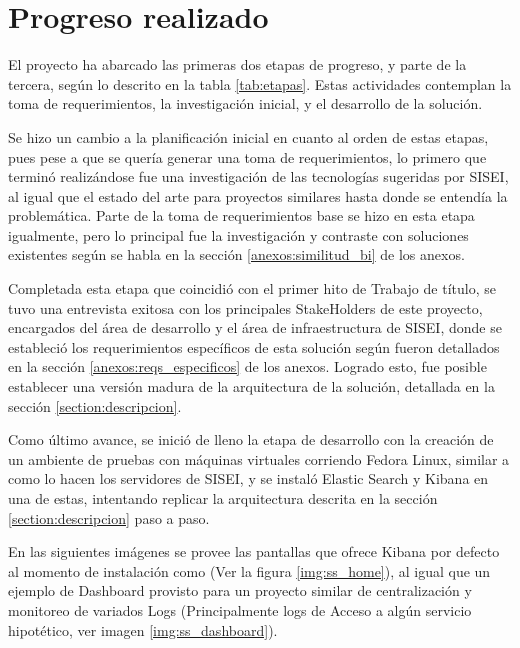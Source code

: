 \section{Progreso realizado}

El proyecto ha abarcado las primeras dos etapas de progreso, y parte de la tercera, según lo descrito en la tabla \ref{tab:etapas}. Estas actividades contemplan la toma de requerimientos, la investigación inicial, y el desarrollo de la solución.

Se hizo un cambio a la planificación inicial en cuanto al orden de estas etapas, pues pese a que se quería generar una toma de requerimientos, lo primero que terminó realizándose fue una investigación de las tecnologías sugeridas por SISEI, al igual que el estado del arte para proyectos similares hasta donde se entendía la problemática. Parte de la toma de requerimientos base se hizo en esta etapa igualmente, pero lo principal fue la investigación y contraste con soluciones existentes según se habla en la sección \ref{anexos:similitud_bi} de los anexos.

Completada esta etapa que coincidió con el primer hito de Trabajo de título, se tuvo una entrevista exitosa con los principales StakeHolders de este proyecto, encargados del área de desarrollo y el área de infraestructura de SISEI, donde se estableció los requerimientos específicos de esta solución según fueron detallados en la sección \ref{anexos:reqs_especificos} de los anexos. Logrado esto, fue posible establecer una versión madura de la arquitectura de la solución, detallada en la sección \ref{section:descripcion}.

Como último avance, se inició de lleno la etapa de desarrollo con la creación de un ambiente de pruebas con máquinas virtuales corriendo Fedora Linux, similar a como lo hacen los servidores de SISEI, y se instaló Elastic Search y Kibana en una de estas, intentando replicar la arquitectura descrita en la sección \ref{section:descripcion} paso a paso.

En las siguientes imágenes se provee las pantallas que ofrece Kibana por defecto al momento de instalación como  (Ver la figura \ref{img:ss_home}), al igual que un ejemplo de Dashboard provisto para un proyecto similar de centralización y monitoreo de variados Logs (Principalmente logs de Acceso a algún servicio hipotético, ver imagen \ref{img:ss_dashboard}).



\clearpage
